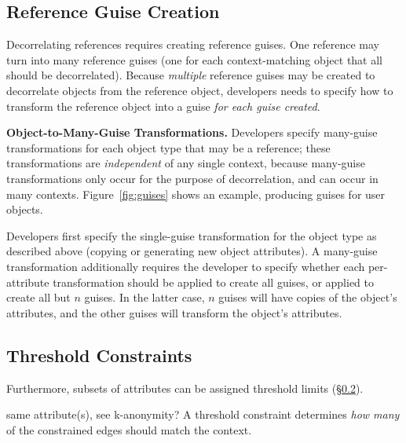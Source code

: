 \subsection{Reference Guise Creation}
\label{sec:reference_guises} 
%
Decorrelating references requires creating reference guises. One reference may turn into many
reference guises (one for each context-matching object that all should be decorrelated).  Because
\emph{multiple} reference guises may be created to decorrelate objects from the reference object,
developers needs to specify how to transform the reference object into a guise \emph{for each guise
created}.

%
\vspace{\baselineskip}
\noindent\textbf{Object-to-Many-Guise Transformations.}
Developers specify many-guise transformations for each object type that may be a reference; these
transformations are \emph{independent} of any single context, because many-guise transformations only
occur for the purpose of decorrelation, and can occur in many contexts.
%
Figure~\ref{fig:guises} shows an example, producing guises for user objects.
%

Developers first specify the single-guise transformation for the object type as described above
(copying or generating new object attributes). A many-guise transformation additionally requires the
developer to specify whether each per-attribute transformation should be applied to create all
guises, or applied to create all but $n$ guises. In the latter case, $n$ guises will have copies of
the object's attributes, and the other guises will transform the object's attributes.
%
%

\subsection{Threshold Constraints}
\label{sec:threshold} 

Furthermore, subsets of attributes can be assigned threshold limits
(\S\ref{sec:threshold}). 

same attribute(s), see k-anonymity?
A threshold constraint determines \emph{how many} of the constrained edges should match the context.

